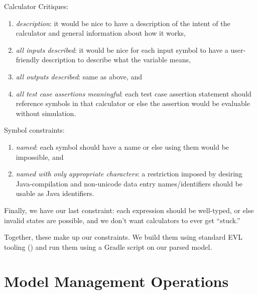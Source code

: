 \documentclass[11pt,fleqn]{article}
\begin{document}
\noindent{}Calculator Critiques:
\begin{enumerate}
  \item \textit{description}: it would be nice to have a description of the
        intent of the calculator and general information about how it works,
  \item \textit{all inputs described}: it would be nice for each input symbol to
        have a user-friendly description to describe what the variable means,
  \item \textit{all outputs described}: same as above, and
  \item \textit{all test case assertions meaningful}: each test case assertion
        statement should reference symbols in that calculator or else the
        assertion would be evaluable without simulation.
\end{enumerate}

\noindent{}Symbol constraints:
\begin{enumerate}
  \item \textit{named}: each symbol should have a name or else using them would
        be impossible, and
  \item \textit{named with only appropriate characters}: a restriction imposed
        by desiring Java-compilation and non-unicode data entry \textemdash{}
        names/identifiers should be usable as Java identifiers.
\end{enumerate}

Finally, we have our last constraint: each expression should be well-typed, or
else invalid states are possible, and we don't want calculators to ever get
``stuck.''

Together, these make up our constraints. We build them using standard EVL
tooling () and run them using a Gradle
script on our parsed model.

\newpage{}

\section{Model Management Operations}
\label{sec:model-management-operations}

\newpage{}

\end{document}

